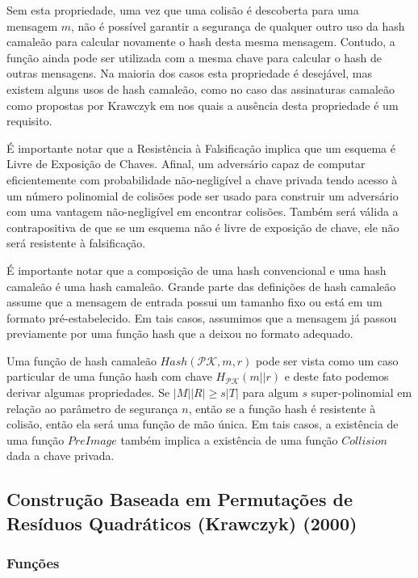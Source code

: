 \documentclass[a4paper]{article}
\begin{document}
\begin{itemize}
  Sem esta propriedade, uma vez que uma colisão é descoberta para uma
  mensagem $m$, não é possível garantir a segurança de qualquer outro
  uso da hash camaleão para calcular novamente o hash desta mesma
  mensagem. Contudo, a função ainda pode ser utilizada com a mesma
  chave para calcular o hash de outras mensagens. Na maioria dos casos
  esta propriedade é desejável, mas existem alguns usos de hash
  camaleão, como no caso das assinaturas camaleão como propostas por
  Krawczyk em \cite{krawczyk} nos quais a ausência desta propriedade é
  um requisito.

  É importante notar que a Resistência à Falsificação implica que um
  esquema é Livre de Exposição de Chaves. Afinal, um adversário capaz
  de computar eficientemente com probabilidade não-negligível a chave
  privada tendo acesso à um número polinomial de colisões pode ser
  usado para construir um adversário com uma vantagem não-negligível
  em encontrar colisões. Também será válida a contrapositiva de que se
  um esquema não é livre de exposição de chave, ele não será
  resistente à falsificação.

  
\end{itemize}

  
É importante notar que a composição de uma hash convencional e uma
hash camaleão é uma hash camaleão. Grande parte das definições de hash
camaleão assume que a mensagem de entrada possui um tamanho fixo ou
está em um formato pré-estabelecido. Em tais casos, assumimos que a
mensagem já passou previamente por uma função hash que a deixou no
formato adequado.

Uma função de hash camaleão $Hash(\mathcal{PK}, m, r)$ pode ser vista
como um caso particular de uma função hash com chave
$H_{\mathcal{PK}}(m||r)$ e deste fato podemos derivar algumas
propriedades. Se $|M||R| \geq s |T|$ para algum $s$ super-polinomial
em relação ao parâmetro de segurança $n$, então se a função hash é
resistente à colisão, então ela será uma função de mão única. Em tais
casos, a existência de uma função $PreImage$ também implica a
existência de uma função $Collision$ dada a chave privada.

\subsection{Construção Baseada em Permutações de Resíduos Qua\-drá\-ti\-cos
  (Krawczyk) (2000) \cite{krawczyk}}

\subsubsection{Funções}
\end{document}
